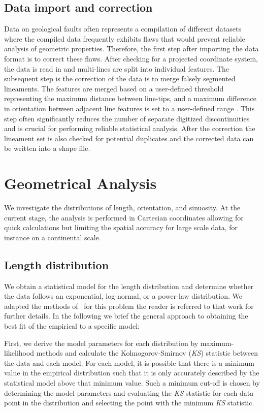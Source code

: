 \documentclass[a4paper,fleqn]{cas-sc}
\begin{document}
\subsection{Data import and correction}
Data on geological faults often represents a compilation of different datasets where the compiled data frequently exhibits flaws that would prevent reliable analysis of geometric properties. Therefore, the first step after importing the data format is to correct these flaws. After checking for a projected coordinate system, the data is read in and multi-lines are split into individual features. The subsequent step is the correction of the data is to merge falsely segmented lineaments. The features are merged based on a user-defined threshold representing the maximum distance between line-tips, and a maximum difference in orientation between adjacent line features is set to a user-defined range . This step often significantly reduces the number of separate digitized discontinuities and is crucial for performing reliable statistical analysis. After the correction the lineament set is also checked for potential duplicates and the corrected data can be written into a shape file.

\section{Geometrical Analysis}
We investigate the distributions of length, orientation, and sinuosity. At the current stage, the analysis is performed in Cartesian coordinates allowing for quick calculations but limiting the spatial accuracy for large scale data, for instance on a continental scale.

\subsection{Length distribution}
We obtain a statistical model for the length distribution and determine whether the data follows an exponential, log-normal, or a power-law distribution. We adapted the methods of~\citep{Clauset2009} for this problem the reader is referred to that work for further details. In the following we brief the general approach to obtaining the best fit of the empirical to a specific model:

First, we derive the model parameters for each distribution by maximum-likelihood methods and calculate the Kolmogorov-Smirnov (\textit{KS}) statistic between the data and each model. For each model, it is possible that there is a minimum value in the empirical distribution such that it is only accurately described by the statistical model above that minimum value. Such a minimum cut-off is chosen by determining the model parameters and evaluating the \textit{KS} statistic for each data point in the distribution and selecting the point with the minimum \textit{KS} statistic.
\end{document}
